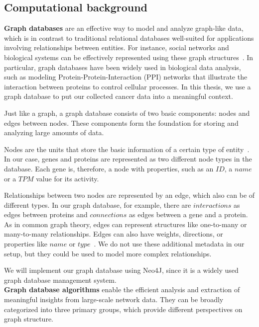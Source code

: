 \subsection{Computational background} \label{subsec:computational_background}
\textbf{Graph databases} are an effective way to model and analyze graph-like data,
which is in contrast to traditional relational databases well-suited for applications involving relationships between entities.
For instance, social networks and biological systems can be effectively represented using these graph structures~\cite{graph_db_survey}.
In particular, graph databases have been widely used in biological data analysis, such as modeling Protein-Protein-Interaction (PPI) networks
that illustrate the interaction between proteins to control cellular processes.
In this thesis, we use a graph database to put our collected cancer data into a meaningful context.

Just like a graph, a graph database consists of two basic components: nodes and edges between nodes.
These components form the foundation for storing and analyzing large amounts of data.

Nodes are the units that store the basic information of a certain type of entity~\cite{graph_db_survey}.
In our case, genes and proteins are represented as two different node types in the database.
Each gene is, therefore, a node with properties, such as an $ID$, a $name$ or a $TPM$ value for its activity.

Relationships between two nodes are represented by an edge, which also can be of different types.
In our graph database, for example, there are $interactions$ as edges between proteins and $connections$ as edges between a gene and a protein.
As in common graph theory, edges can represent structures like one-to-many or many-to-many relationships.
Edges can also have weights, directions, or properties like $name$ or $type$~\cite{graph_db_power_limitations}.
We do not use these additional metadata in our setup, but they could be used to model more complex relationships.

We will implement our graph database using Neo4J, since it is a widely used graph database management system.
\\

\textbf{Graph database algorithms} enable the efficient analysis and extraction of meaningful insights from large-scale network data.
They can be broadly categorized into three primary groups, which provide different perspectives on graph structure.

